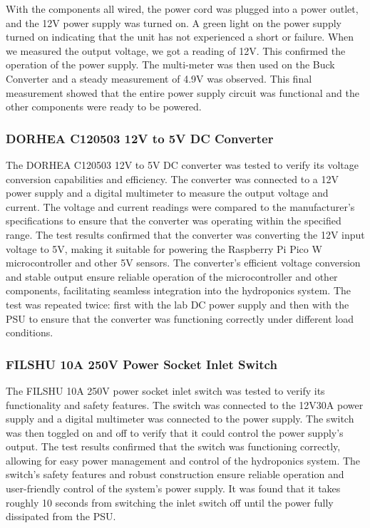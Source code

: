 \documentclass[12pt]{article} %
\begin{document}
\noindent With the components all wired, the power cord was plugged into a power outlet, and the 12V power supply was turned on. A green light on the power supply turned on indicating that the unit has not experienced a short or failure. When we measured the output voltage, we got a reading of 12V. This confirmed the operation of the power supply. The multi-meter was then used on the Buck Converter and a steady measurement of 4.9V was observed. This final measurement showed that the entire power supply circuit was functional and the other components were ready to be powered. 
\subsubsection{DORHEA C120503 12V to 5V DC Converter}
\noindent The DORHEA C120503 12V to 5V DC converter was tested to verify its voltage conversion capabilities and efficiency. The converter was connected to a 12V power supply and a digital multimeter to measure the output voltage and current. The voltage and current readings were compared to the manufacturer's specifications to ensure that the converter was operating within the specified range. The test results confirmed that the converter was converting the 12V input voltage to 5V, making it suitable for powering the Raspberry Pi Pico W microcontroller and other 5V sensors. The converter's efficient voltage conversion and stable output ensure reliable operation of the microcontroller and other components, facilitating seamless integration into the hydroponics system. The test was repeated twice: first with the lab DC power supply and then with the PSU to ensure that the converter was functioning correctly under different load conditions.

\pagebreak
\subsubsection{FILSHU 10A 250V Power Socket Inlet Switch}
\noindent The FILSHU 10A 250V power socket inlet switch was tested to verify its functionality and safety features. The switch was connected to the 12V30A power supply and a digital multimeter was connected to the power supply. The switch was then toggled on and off to verify that it could control the power supply's output. The test results confirmed that the switch was functioning correctly, allowing for easy power management and control of the hydroponics system. The switch's safety features and robust construction ensure reliable operation and user-friendly control of the system's power supply. It was found that it takes roughly 10 seconds from switching the inlet switch off until the power fully dissipated from the PSU.
\end{document}
